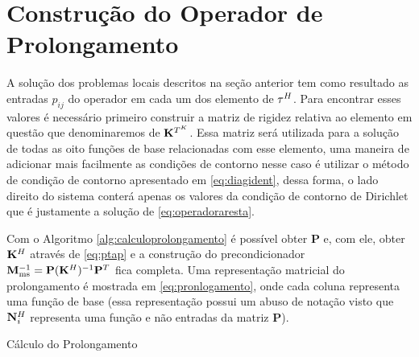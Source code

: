 \section{Construção do Operador de Prolongamento}

A solução dos problemas locais descritos na seção anterior tem como resultado as entradas $p_{ij}$ do operador em cada um dos elemento de $\tau^H$. Para encontrar esses valores é necessário primeiro construir a matriz de rigidez relativa ao elemento em questão que denominaremos de $\mathbf{K}^{T^K}$. Essa matriz será utilizada para a solução de todas as oito funções de base relacionadas com esse elemento, uma maneira de adicionar mais facilmente as condições de contorno nesse caso é utilizar o método de condição de contorno apresentado em \eqref{eq:diagident}, dessa forma, o lado direito do sistema conterá apenas os valores da condição de contorno de Dirichlet que é justamente a solução de \eqref{eq:operadoraresta}.


Com o Algoritmo \ref{alg:calculoprolongamento} é possível obter $\mathbf{P}$ e, com ele, obter $\mathbf{K}^H$ através de \eqref{eq:ptap} e a construção do precondicionador $\mathbf{M}^{-1}_{\text{ms}} = \mathbf{P} (\mathbf{K}^H)^{-1} \mathbf{P}^{T}$ fica completa. Uma representação matricial do prolongamento é mostrada em \eqref{eq:pronlogamento}, onde cada coluna representa uma função de base (essa representação possui um abuso de notação visto que $\mathbf{N}_{i}^H$ representa uma função e não entradas da matriz $\mathbf{P}$).



\vspace{1cm}
\begin{algorithm}[H]
\caption{Cálculo do Prolongamento}\label{alg:calculoprolongamento}
\end{algorithm}
\vspace{1cm}






